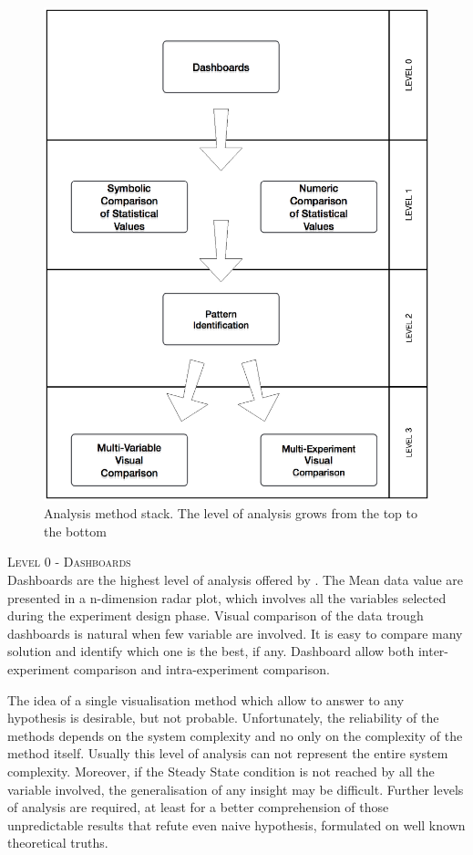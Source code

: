 \begin{figure}[tbh]
  \centering
	\includegraphics[width=\linewidth]{images/analysis-method}
	\caption{Analysis method stack. The level of analysis grows from the top to the bottom} 
  	\label{fig:analysis-method}
\end{figure}


\textsc{Level 0 - Dashboards}\\

Dashboards are the highest level of analysis offered by \namens. The Mean data value are presented in a n-dimension radar plot, which involves all the variables selected during the experiment design phase. Visual comparison of the data trough dashboards is natural when few variable are involved. It is easy to compare many solution and identify which one is the best, if any. Dashboard allow both inter-experiment comparison and intra-experiment comparison. 

The idea of a single visualisation method which allow to answer to any hypothesis is desirable, but not probable.  Unfortunately, the reliability of the methods depends on the system complexity and no only on the complexity of the method itself. Usually this level of analysis can not represent the entire system complexity. Moreover, if the Steady State condition is not reached by all the variable involved, the generalisation of any insight may be difficult. Further levels of analysis are required, at least for a better comprehension of those unpredictable results that refute even naive hypothesis, formulated on well known theoretical truths.\\

